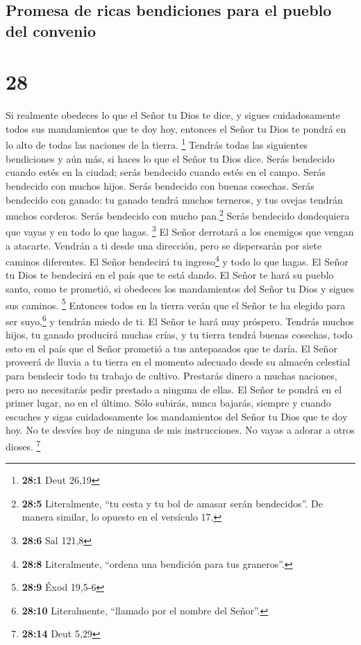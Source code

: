 \hypertarget{promesa-de-ricas-bendiciones-para-el-pueblo-del-convenio}{%
\subsection{Promesa de ricas bendiciones para el pueblo del
convenio}\label{promesa-de-ricas-bendiciones-para-el-pueblo-del-convenio}}

\hypertarget{section-27}{%
\section{28}\label{section-27}}

 Si realmente obedeces lo que el Señor tu Dios te dice, y
sigues cuidadosamente todos sus mandamientos que te doy hoy, entonces el
Señor tu Dios te pondrá en lo alto de todas las naciones de la tierra.
\footnote{\textbf{28:1} Deut 26,19}  Tendrás todas las
siguientes bendiciones y aún más, si haces lo que el Señor tu Dios dice.
 Serás bendecido cuando estés en la ciudad; serás
bendecido cuando estés en el campo.  Serás bendecido con
muchos hijos. Serás bendecido con buenas cosechas. Serás bendecido con
ganado: tu ganado tendrá muchos terneros, y tus ovejas tendrán muchos
corderos.  Serás bendecido con mucho pan.\footnote{\textbf{28:5}
  Literalmente, ``tu cesta y tu bol de amasar serán bendecidos''. De
  manera similar, lo opuesto en el versículo 17.}  Serás
bendecido dondequiera que vayas y en todo lo que hagas. \footnote{\textbf{28:6}
  Sal 121,8}  El Señor derrotará a los enemigos que vengan
a atacarte. Vendrán a ti desde una dirección, pero se dispersarán por
siete caminos diferentes.  El Señor bendecirá tu
ingreso\footnote{\textbf{28:8} Literalmente, ``ordena una bendición para
  tus graneros''.} y todo lo que hagas. El Señor tu Dios te bendecirá en
el país que te está dando.  El Señor te hará su pueblo
santo, como te prometió, si obedeces los mandamientos del Señor tu Dios
y sigues sus caminos. \footnote{\textbf{28:9} Éxod 19,5-6}
 Entonces todos en la tierra verán que el Señor te ha
elegido para ser suyo,\footnote{\textbf{28:10} Literalmente, ``llamado
  por el nombre del Señor''.} y tendrán miedo de ti.  El
Señor te hará muy próspero. Tendrás muchos hijos, tu ganado producirá
muchas crías, y tu tierra tendrá buenas cosechas, todo esto en el país
que el Señor prometió a tus antepasados que te daría.  El
Señor proveerá de lluvia a tu tierra en el momento adecuado desde su
almacén celestial para bendecir todo tu trabajo de cultivo. Prestarás
dinero a muchas naciones, pero no necesitarás pedir prestado a ninguna
de ellas.  El Señor te pondrá en el primer lugar, no en
el último. Sólo subirás, nunca bajarás, siempre y cuando escuches y
sigas cuidadosamente los mandamientos del Señor tu Dios que te doy hoy.
 No te desvíes hoy de ninguna de mis instrucciones. No
vayas a adorar a otros dioses. \footnote{\textbf{28:14} Deut 5,29}

